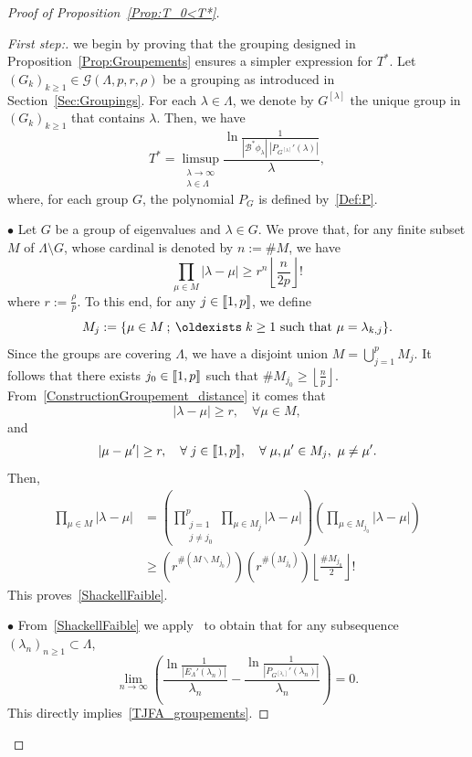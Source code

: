 \documentclass[11pt]{article}
\theoremstyle{definition}
\newenvironment{proofc}{\begin{proof}}{\end{proof}}
\numberwithin{equation}{section}
\numberwithin{figure}{section}
\numberwithin{table}{section}
\newenvironment{step}[1]{\begin{proof}[#1]}{\let\qed\relax\end{proof}}
\newcommand{\llbracket}{\mathopen{[\mkern -2.7mu[}}
\newcommand{\rrbracket}{\mathclose{]\mkern -2.7mu]}}
\newcommand{\inter}[2]{\llbracket #1,#2 \rrbracket}
\newcommand\Bs{\mathcal{B}^*}
\renewcommand*{\exists}{\mathrel{\oldexists}}
\let\oldforall\forall
\renewcommand*{\forall}{\mathrel{\oldforall}}
\begin{document}
\begin{proofc}[{Proof of Proposition~\ref{Prop:T_0<T*}}]
\begin{step}{First step:}
we begin by proving that the grouping designed in Proposition~\ref{Prop:Groupements} ensures a simpler expression for $T^*$. Let $(G_k)_{k \geq 1}\in \mathcal{G}(\Lambda,p,r,\rho)$ be a grouping as introduced in Section~\ref{Sec:Groupings}. For each $\lambda\in \Lambda$, we denote by $G^{[\lambda]}$ the unique group in $(G_k)_{k\geq 1}$ that contains $\lambda$. Then, we have
\begin{equation}\label{TJFA_groupements}
T^*=\limsup_{\substack{\lambda\to \infty\\ \lambda\in \Lambda}} \frac{\ln \frac{1}{| \Bs\phi_\lambda | \: | P_{G^{[\lambda]}}' (\lambda) |}}{ \lambda },
\end{equation}
where, for each group $G$, the polynomial $P_G$ is defined by~\eqref{Def:P}.


\noindent $\bullet$ Let $G$ be a group of eigenvalues and $\lambda \in G$. We prove that, for any finite subset $M$ of $\Lambda\setminus G$, whose cardinal is denoted by $n:=\# M$, we have
\begin{equation}\label{ShackellFaible}
\prod_{\mu \in M} |\lambda- \mu| \geq r^n \left\lfloor \frac{n}{2p} \right\rfloor !
\end{equation}
where $r:= \frac{\rho}{p}$. To this end, for any $j \in \inter{1}{p}$, we define
\[
M_j := \{ \mu\in M \: ; \: \exists k \geq 1 \text{ such that } \mu = \lambda_{k,j} \}.
\]
Since the groups are covering $\Lambda$, we have a disjoint union $M = \displaystyle\bigcup_{j=1}^p M_j$. It follows that there exists $j_0 \in \inter{1}{p}$ such that $\# M_{j_0} \geq \left\lfloor \frac{n}{p} \right\rfloor$. From~\eqref{ConstructionGroupement_distance} it comes that
\[
|\lambda - \mu | \geq r, \quad \forall \mu \in M,
\]
and
\[
|\mu - \mu'| \geq r, \quad \forall j \in \inter{1}{p},\quad\forall \mu, \mu' \in M_j, \ \mu\neq \mu'.
\]
Then,
\begin{align*}
\prod_{\mu \in M} |\lambda- \mu| &= \left(\prod_{\substack{j=1 \\ j \neq j_0}}^p \prod_{\mu \in M_j} |\lambda-\mu| \right) \left(\prod_{\mu \in M_{j_0}} |\lambda-\mu|\right)
\\
&\geq \left(r^{\# (M\backslash M_{j_0})} \right) \left(r^{\# (M_{j_0})}\right) \left\lfloor \frac{\#M_{j_0}}{2} \right\rfloor!
\end{align*}
This proves~\eqref{ShackellFaible}.

\medskip
\noindent $\bullet$ From~\eqref{ShackellFaible} we apply~\cite[Theorem~3.8]{AmmarKhodjaBenabdallahGonzalez-BurgosdeTeresa:2014} to obtain that for any subsequence $(\lambda_n)_{n \geq 1} \subset \Lambda$,
\begin{equation}\label{JFA_Th3.8}
\lim_{n \to \infty} \left(\frac{\ln \frac{1}{|E_\Lambda'(\lambda_n)|}}{\lambda_n} - \frac{\ln \frac{1}{|P_{G^{[\lambda_n]}}'(\lambda_n)|}}{\lambda_n} \right) = 0.
\end{equation}
This directly implies~\eqref{TJFA_groupements}.


\end{step}
\end{proofc}
\end{document}
